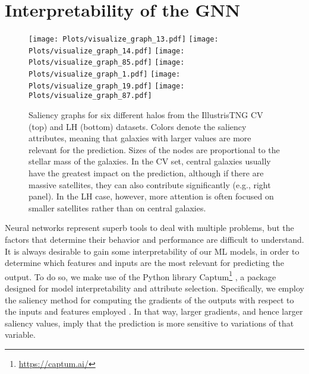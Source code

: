 \documentclass[twocolumn]{aastex631}
\begin{document}
\section{Interpretability of the GNN}
\label{sec:interpret}



\begin{figure*}[th!]
\begin{center}
\texttt{[image: Plots/visualize\_graph\_13.pdf]}
\texttt{[image: Plots/visualize\_graph\_14.pdf]}
\texttt{[image: Plots/visualize\_graph\_85.pdf]}
\texttt{[image: Plots/visualize\_graph\_1.pdf]}
\texttt{[image: Plots/visualize\_graph\_19.pdf]}
\texttt{[image: Plots/visualize\_graph\_87.pdf]}
\caption{Saliency graphs for six different halos from the IllustrisTNG CV (top) and LH (bottom) datasets. Colors denote the saliency attributes, meaning that galaxies with larger values are more relevant for the prediction. Sizes of the nodes are proportional to the stellar mass of the galaxies. In the CV set, central galaxies usually have the greatest impact on the prediction, although if there are massive satellites, they can also contribute significantly (e.g., right panel). In the LH case, however, more attention is often focused on smaller satellites rather than on central galaxies.}
\label{fig:saliencygraphs}
\end{center}
\end{figure*}

Neural networks represent superb tools to deal with multiple problems, but the factors that determine their behavior and performance are difficult to understand. It is always desirable to gain some interpretability of our ML models, in order to determine which features and inputs are the most relevant for predicting the output.  To do so, we make use of the Python library Captum\footnote{\url{https://captum.ai/}} \citep{kokhlikyan2020captum}, a package designed for model interpretability and attribute selection. Specifically, we employ the saliency method for computing the gradients of the outputs with respect to the inputs and features employed \citep{2013arXiv1312.6034S}. In that way, larger gradients, and hence larger saliency values, imply that the prediction is more sensitive to variations of that variable.
\end{document}
